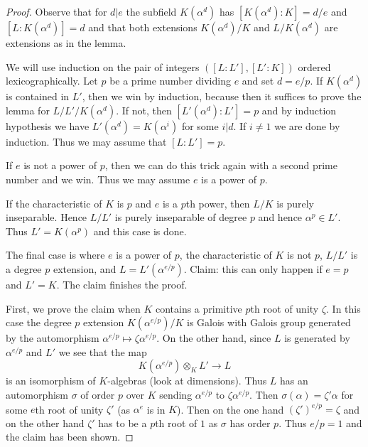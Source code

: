 \begin{proof}
Observe that for $d | e$ the subfield $K(\alpha^d)$ has
$[K(\alpha^d) : K] = d/e$ and $[L : K(\alpha^d)] = d$
and that both extensions $K(\alpha^d)/K$ and $L/K(\alpha^d)$
are extensions as in the lemma.

\medskip\noindent
We will use induction on the pair of integers $([L : L'], [L' : K])$
ordered lexicographically.
Let $p$ be a prime number dividing $e$ and set $d = e/p$.
If $K(\alpha^d)$ is contained in $L'$, then we win
by induction, because then it suffices to prove the lemma
for $L/L'/K(\alpha^d)$. If not, then $[L'(\alpha^d) : L'] = p$
and by induction hypothesis we have $L'(\alpha^d) = K(\alpha^i)$
for some $i | d$. If $i \not = 1$ we are done by induction.
Thus we may assume that $[L : L'] = p$.

\medskip\noindent
If $e$ is not a power of $p$, then we can do this trick
again with a second prime number and we win. Thus we may
assume $e$ is a power of $p$.

\medskip\noindent
If the characteristic of $K$ is $p$ and $e$ is a $p$th power, then
$L/K$ is purely inseparable. Hence $L/L'$ is purely inseparable
of degree $p$ and hence $\alpha^p \in L'$.
Thus $L' = K(\alpha^p)$ and this case is done.

\medskip\noindent
The final case is where $e$ is a power of $p$,
the characteristic of $K$ is not $p$,
$L/L'$ is a degree $p$ extension, and
$L = L'(\alpha^{e/p})$. Claim: this can
only happen if $e = p$ and $L' = K$. The claim finishes the proof.

\medskip\noindent
First, we prove the claim when $K$ contains a primitive
$p$th root of unity $\zeta$. In this case the degree $p$ extension
$K(\alpha^{e/p})/K$ is Galois with Galois group generated
by the automorphism $\alpha^{e/p} \mapsto \zeta \alpha^{e/p}$.
On the other hand, since $L$ is generated by
$\alpha^{e/p}$ and $L'$ we see that the map
$$
K(\alpha^{e/p}) \otimes_K L' \longrightarrow L
$$
is an isomorphism of $K$-algebras (look at dimensions).
Thus $L$ has an automorphism $\sigma$ of order $p$ over $K$ sending
$\alpha^{e/p}$ to $\zeta \alpha^{e/p}$. Then
$\sigma(\alpha) = \zeta' \alpha$ for some $e$th root of unity $\zeta'$
(as $\alpha^e$ is in $K$).
Then on the one hand $(\zeta')^{e/p} = \zeta$ and on the other
hand $\zeta'$ has to be a $p$th root of $1$ as $\sigma$
has order $p$. Thus $e/p = 1$ and the claim has been shown.


\end{proof}
